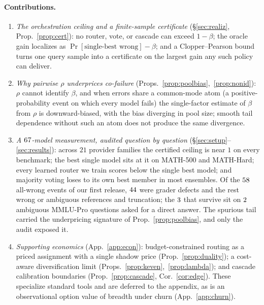 \documentclass[11pt]{article}
\theoremstyle{plain}
\theoremstyle{definition}
\begin{document}
\paragraph{Contributions.}
\begin{enumerate}\itemsep2pt
\item \emph{The orchestration ceiling and a finite-sample certificate} (\S\ref{sec:realiz}, Prop.~\ref{prop:cert}): no router,
vote, or cascade can exceed $1-\beta$; the oracle gain localizes as $\Pr[\text{single-best wrong}]-\beta$; and a Clopper--Pearson
bound turns one query sample into a certificate on the largest gain any such policy can deliver.
\item \emph{Why pairwise $\rho$ underprices co-failure} (Props.~\ref{prop:poolbias},~\ref{prop:nonid}): $\rho$ cannot
identify $\beta$, and when errors share a common-mode atom (a positive-probability event on which every model fails) the
single-factor estimate of $\beta$ from $\rho$ is downward-biased, with the bias diverging in pool size; smooth tail
dependence without such an atom does not produce the same divergence.
\item \emph{A $67$-model measurement, audited question by question} (\S\ref{sec:setup}--\ref{sec:results}): across
$21$ provider families the certified ceiling is near $1$ on every benchmark; the best single model sits at it on MATH-500 and
MATH-Hard; every learned router we train scores below the single best model; and majority voting loses to its own best member
in most ensembles. Of the $58$ all-wrong events of our first release, $44$ were grader defects and the rest
wrong or ambiguous references and truncation; the $3$ that survive sit on $2$
ambiguous MMLU-Pro questions asked for a direct answer. The spurious tail carried the underpricing signature of
Prop.~\ref{prop:poolbias}, and only the audit exposed it.
\item \emph{Supporting economics} (App.~\ref{app:econ}): budget-constrained routing as a priced assignment with a single shadow
price (Prop.~\ref{prop:duality}); a cost-aware diversification limit (Props.~\ref{prop:keven},~\ref{prop:lambda}); and cascade
calibration boundaries (Prop.~\ref{prop:cascade}, Cor.~\ref{cor:edge}). These specialize standard tools and are deferred to the
appendix, as is an observational option value of breadth under churn (App.~\ref{app:churn}).
\end{enumerate}
\end{document}
